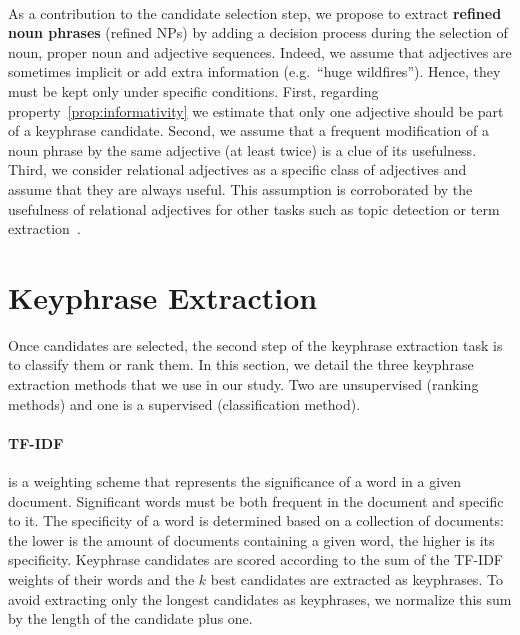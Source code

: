   \paragraph{}
  As a contribution to the candidate selection step, we propose to extract
  \textbf{refined noun phrases} (refined NPs) by adding a decision process
  during the selection of noun, proper noun and adjective sequences. Indeed,
  we assume that adjectives are sometimes implicit or add extra information
  (e.g.~``huge wildfires''). Hence, they must be kept only under specific
  conditions. First, regarding property~\ref{prop:informativity} we estimate
  that only one adjective should be part of a keyphrase candidate. Second, we
  assume that a frequent modification of a noun phrase by the same adjective
  (at least twice) is a clue of its usefulness. Third, we consider relational
  adjectives as a specific class of adjectives and assume that they are always
  useful. This assumption is corroborated by the usefulness of relational
  adjectives for other tasks such as topic detection or term
  extraction~\cite{daille2001relationaladjectives}.

\section{Keyphrase Extraction}
\label{sec:keyphrase_extraction}
  Once candidates are selected, the second step of the keyphrase extraction task
  is to classify them or rank them. In this section, we detail the three
  keyphrase extraction methods that we use in our study. Two are unsupervised
  (ranking methods) and one is a supervised (classification method).

  \paragraph{TF-IDF~\textnormal{\cite{jones1972tfidf}}} is a weighting scheme
  that represents the significance of a word in a given document. Significant
  words must be both frequent in the document and specific to it. The
  specificity of a word is determined based on a collection of documents: the
  lower is the amount of documents containing a given word, the higher is its
  specificity. Keyphrase candidates are scored according to the sum of the
  TF-IDF weights of their words and the $k$ best candidates are extracted as
  keyphrases. To avoid extracting only the longest candidates as keyphrases, we
  normalize this sum by the length of the candidate plus one.

